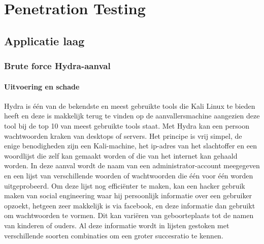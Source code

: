 \documentclass[pdftex,a4paper,12pt]{report}
\begin{document}
\chapter{Penetration Testing}
\section{Applicatie laag}
\subsection{Brute force Hydra-aanval}
\subsubsection{Uitvoering en schade}
Hydra is één van de bekendste en meest gebruikte tools die Kali Linux te bieden heeft en deze is makkelijk terug te vinden op de aanvallersmachine aangezien deze tool bij de top 10 van meest gebruikte tools staat. Met Hydra kan een persoon wachtwoorden kraken van desktops of servers. Het principe is vrij simpel, de enige benodigheden zijn een Kali-machine, het ip-adres van het slachtoffer en een woordlijst die zelf kan gemaakt worden of die van het internet kan gehaald worden. In deze aanval wordt de naam van een administrator-account meegegeven en een lijst van verschillende woorden of wachtwoorden die één voor één worden uitgeprobeerd. Om deze lijst nog efficiënter te maken, kan een hacker gebruik maken van social engineering waar hij persoonlijk informatie over een gebruiker opzoekt, hetgeen zeer makkelijk is via facebook, en deze informatie dan gebruikt om wachtwoorden te vormen. Dit kan variëren van geboorteplaats tot de namen van kinderen of ouders. Al deze informatie wordt in lijsten gestoken met verschillende soorten combinaties om een groter succesratio te kennen. \citep{Wilde2013} \newline 
\end{document}
